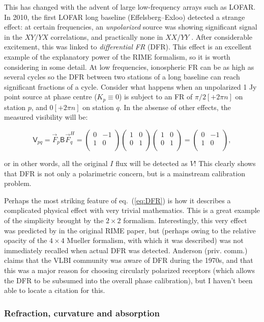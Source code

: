 \documentclass[]{aa}
\newcommand{\matrixtt}[4]{\left( \begin{array}{cc}#1&#2\\#3&#4\\\end{array} \right)}
\newcommand{\herm}{H}
\newcommand{\jones}[2]{\vec {#1}_{#2}}
\newcommand{\jonesT}[2]{\vec {#1}^{\herm}_{#2}}
\newcommand{\coh}[2]{\mathsf{{#1}}_{{#2}}}
\begin{document}
This has changed with the advent of large low-frequency arrays such as LOFAR. In 2010, the first LOFAR long baseline (Effelsberg--Exloo) detected a strange effect: at certain frequencies, an \emph{unpolarized} source was showing significant signal in the $XY/YX$ correlations, and practically none in $XX/YY$ \citep{Wucknitz:DFR}. After considerable excitement, this was linked to \emph{differential FR} (DFR). This effect is an excellent example of the explanatory power of the RIME formalism, so it is worth considering in some detail. At low frequencies, ionospheric FR can be as high as several cycles \citep[e.g. 15 cycles at 100 MHz, see][Sect.~10.3]{tms} so the DFR between two stations of a long baseline can reach significant fractions of a cycle. Consider what happens when an unpolarized 1 Jy point source at phase centre ($K_p\equiv0$) is subject to an FR of $\pi/2[+2\pi n]$ on station $p$, and $0[+2\pi n]$ on station $q$. In the absense of other effects, the measured visibility will be:

\begin{equation}\label{eq:DFR}
\coh{V}{pq} = \jones{F}{p}\coh{B}{}\jonesT{F}{q} = \matrixtt{0}{-1}{1}{0} \matrixtt{1}{0}{0}{1} \matrixtt{1}{0}{0}{1} = \matrixtt{0}{-1}{1}{0},
\end{equation}

or in other words, all the original $I$ flux will be detected as $V$! This clearly shows that DFR is not only a polarimetric concern, but is a mainstream calibration problem.

Perhaps the most striking feature of eq.~(\ref{eq:DFR}) is how it describes a complicated physical effect with very trivial mathematics. This is a great example of the simplicity brought by the $2\times2$ formalism. Interestingly, this very effect was predicted by \citet{ME1} in the original RIME paper, but (perhaps owing to the relative opacity of the $4\times4$ Mueller formalism, with which it was described) was not immediately recalled when actual DFR was detected. Anderson (priv. comm.) claims that the VLBI community was aware of DFR during the 1970s, and that this was a major reason for choosing circularly polarized receptors (which allows the DFR to be subsumed into the overall phase calibration), but I haven't been able to locate a citation for this.

\subsubsection{Refraction, curvature and absorption}
\end{document}
